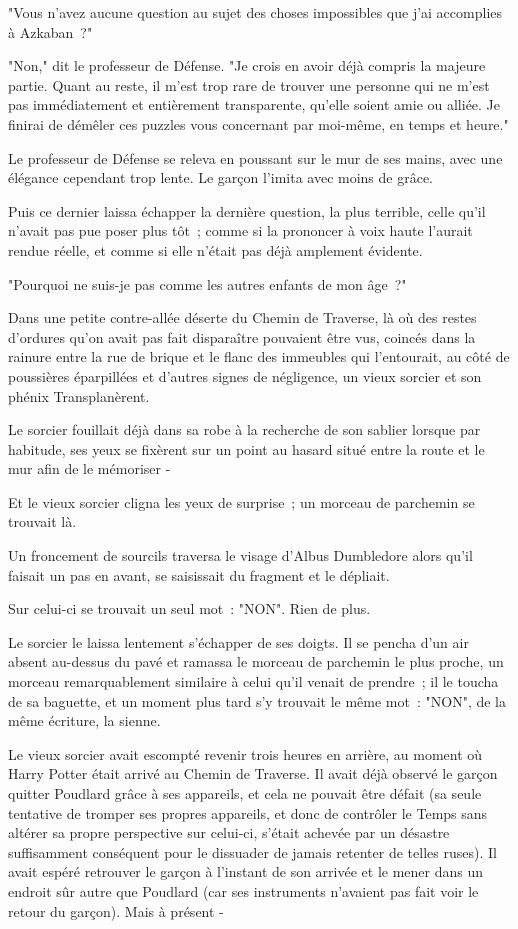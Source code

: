 "Vous n'avez aucune question au sujet des choses impossibles que j'ai accomplies à Azkaban~?"

"Non," dit le professeur de Défense. "Je crois en avoir déjà compris la majeure partie. Quant au reste, il m'est trop rare de trouver une personne qui ne m'est pas immédiatement et entièrement transparente, qu'elle soient amie ou alliée. Je finirai de démêler ces puzzles vous concernant par moi-même, en temps et heure."

Le professeur de Défense se releva en poussant sur le mur de ses mains, avec une élégance cependant trop lente. Le garçon l'imita avec moins de grâce.

Puis ce dernier laissa échapper la dernière question, la plus terrible, celle qu'il n'avait pas pue poser plus tôt~; comme si la prononcer à voix haute l'aurait rendue réelle, et comme si elle n'était pas déjà amplement évidente.

"Pourquoi ne suis-je pas comme les autres enfants de mon âge~?"

\later

Dans une petite contre-allée déserte du Chemin de Traverse, là où des restes d'ordures qu'on avait pas fait disparaître pouvaient être vus, coincés dans la rainure entre la rue de brique et le flanc des immeubles qui l'entourait, au côté de poussières éparpillées et d'autres signes de négligence, un vieux sorcier et son phénix Transplanèrent.

Le sorcier fouillait déjà dans sa robe à la recherche de son sablier lorsque par habitude, ses yeux se fixèrent sur un point au hasard situé entre la route et le mur afin de le mémoriser -

Et le vieux sorcier cligna les yeux de surprise~; un morceau de parchemin se trouvait là.

Un froncement de sourcils traversa le visage d'Albus Dumbledore alors qu'il faisait un pas en avant, se saisissait du fragment et le dépliait.

Sur celui-ci se trouvait un seul mot~: "NON". Rien de plus.

Le sorcier le laissa lentement s'échapper de ses doigts. Il se pencha d'un air absent au-dessus du pavé et ramassa le morceau de parchemin le plus proche, un morceau remarquablement similaire à celui qu'il venait de prendre~; il le toucha de sa baguette, et un moment plus tard s'y trouvait le même mot~: "NON", de la même écriture, la sienne.

Le vieux sorcier avait escompté revenir trois heures en arrière, au moment où Harry Potter était arrivé au Chemin de Traverse. Il avait déjà observé le garçon quitter Poudlard grâce à ses appareils, et cela ne pouvait être défait (sa seule tentative de tromper ses propres appareils, et donc de contrôler le Temps sans altérer sa propre perspective sur celui-ci, s'était achevée par un désastre suffisamment conséquent pour le dissuader de jamais retenter de telles ruses). Il avait espéré retrouver le garçon à l'instant de son arrivée et le mener dans un endroit sûr autre que Poudlard (car ses instruments n'avaient pas fait voir le retour du garçon). Mais à présent -

